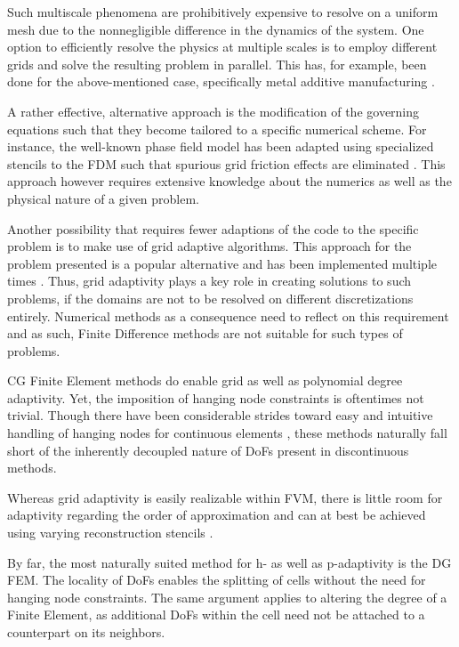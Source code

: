 \documentclass[asi,article,submit,moreauthors]{Definitions/mdpi}
\begin{document}
Such multiscale phenomena are prohibitively expensive to resolve on a uniform mesh due to the nonnegligible difference in the dynamics of the system.
One option to efficiently resolve the physics at multiple scales is to employ different grids and solve the resulting problem in parallel.
This has, for example, been done for the above-mentioned case, specifically metal additive manufacturing \cite{ghanbariAdaptiveLocalglobalMultiscale2020}.

A rather effective, alternative approach is the modification of the governing equations such that they become tailored to a specific numerical scheme.
For instance, the well-known phase field model has been adapted using specialized stencils to the FDM such that spurious grid friction effects are eliminated \cite{fleckSharpPhasefieldModeling2023,fleckFrictionlessMotionDiffuse2022}. 
This approach however requires extensive knowledge about the numerics as well as the physical nature of a given problem.

Another possibility that requires fewer adaptions of the code to the specific problem is to make use of grid adaptive algorithms.
This approach for the problem presented is a popular alternative and has been implemented multiple times \cite{proellHighlyEfficientComputational2023,olleakEnablingPartScaleScanwise2022,olleakPartscaleFiniteElement2020,olleakScanwiseAdaptiveRemeshing2020a}.
Thus, grid adaptivity plays a key role in creating solutions to such problems, if the domains are not to be resolved on different discretizations entirely.
Numerical methods as a consequence need to reflect on this requirement and as such, Finite Difference methods are not suitable for such types of problems.

CG Finite Element methods do enable grid as well as polynomial degree adaptivity.
Yet, the imposition of hanging node constraints is oftentimes not trivial.
Though there have been considerable strides toward easy and intuitive handling of hanging nodes for continuous elements \cite{solinArbitrarylevelHangingNodes2008,bangerthDataStructuresRequirements2009}, these methods naturally fall short of the inherently decoupled nature of DoFs present in discontinuous methods.

Whereas grid adaptivity is easily realizable within FVM, there is little room for adaptivity regarding the order of approximation and can at best be achieved using varying reconstruction stencils \cite{shuHighorderFiniteDifference2003}.

By far, the most naturally suited method for h- as well as p-adaptivity is the DG FEM.
The locality of DoFs enables the splitting of cells without the need for hanging node constraints.
The same argument applies to altering the degree of a Finite Element, as additional DoFs within the cell need not be attached to a counterpart on its neighbors.
\end{document}
